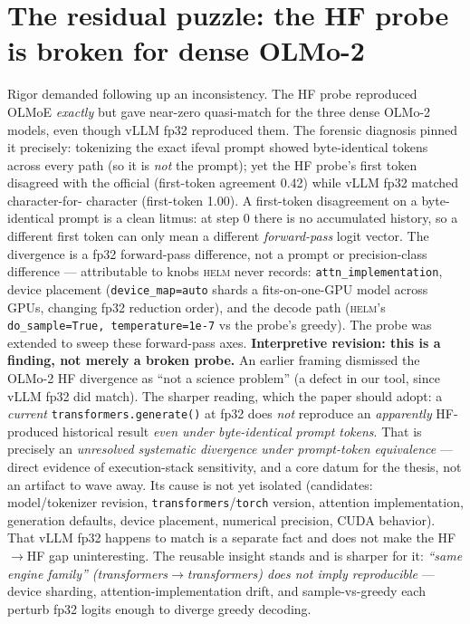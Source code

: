 \documentclass[11pt]{report}
\newcommand{\code}[1]{\texttt{#1}}
\begin{document}
\section{The residual puzzle: the HF probe is broken for dense OLMo-2}

Rigor demanded following up an inconsistency. The HF probe reproduced OLMoE
\emph{exactly} but gave near-zero quasi-match for the three dense OLMo-2 models,
even though vLLM fp32 reproduced them. The forensic diagnosis pinned it precisely:
tokenizing the exact ifeval prompt showed byte-identical tokens across every path
(so it is \emph{not} the prompt); yet the HF probe's first token disagreed with the
official (first-token agreement 0.42) while vLLM fp32 matched character-for-
character (first-token 1.00). A first-token disagreement on a byte-identical prompt
is a clean litmus: at step 0 there is no accumulated history, so a different first
token can only mean a different \emph{forward-pass} logit vector. The divergence is
a fp32 forward-pass difference, not a prompt or precision-class difference ---
attributable to knobs \textsc{helm} never records: \code{attn\_implementation},
device placement (\code{device\_map=auto} shards a fits-on-one-GPU model across
GPUs, changing fp32 reduction order), and the decode path (\textsc{helm}'s
\code{do\_sample=True, temperature=1e-7} vs the probe's greedy). The probe was
extended to sweep these forward-pass axes. \textbf{Interpretive revision: this is a
finding, not merely a broken probe.} An earlier framing dismissed the OLMo-2 HF
divergence as ``not a science problem'' (a defect in our tool, since vLLM fp32 did
match). The sharper reading, which the paper should adopt: a \emph{current}
\code{transformers.generate()} at fp32 does \emph{not} reproduce an
\emph{apparently} HF-produced historical result \emph{even under byte-identical
prompt tokens}. That is precisely an \emph{unresolved systematic divergence under
prompt-token equivalence} --- direct evidence of execution-stack sensitivity, and a
core datum for the thesis, not an artifact to wave away. Its cause is not yet
isolated (candidates: model/tokenizer revision, \code{transformers}/\code{torch}
version, attention implementation, generation defaults, device placement, numerical
precision, CUDA behavior). That vLLM fp32 happens to match is a separate fact and
does not make the HF$\to$HF gap uninteresting. The reusable insight stands and is
sharper for it: \emph{``same engine family'' (transformers$\rightarrow$transformers)
does not imply reproducible} --- device sharding, attention-implementation drift, and
sample-vs-greedy each perturb fp32 logits enough to diverge greedy decoding.
\end{document}
